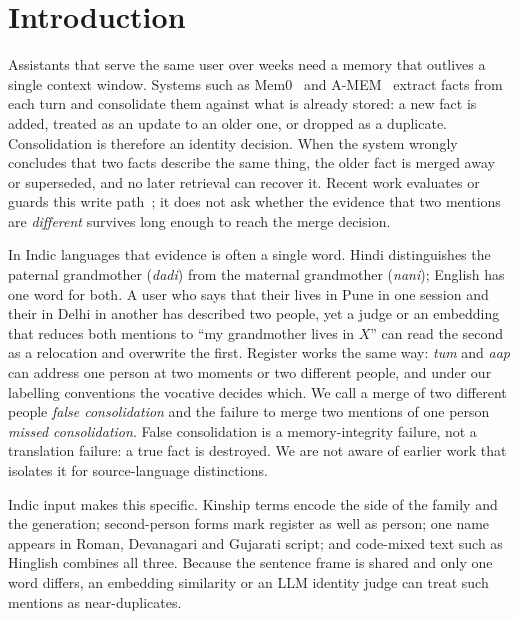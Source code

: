 \section{Introduction}
\label{sec:intro}

Assistants that serve the same user over weeks need a memory that outlives a single context window. Systems such as
Mem0~\citep{chhikara2025mem0} and A-MEM~\citep{xu2025amem} extract facts from each turn and consolidate them against what is already
stored: a new fact is added, treated as an update to an older one, or dropped as a duplicate. Consolidation is therefore an identity
decision. When the system wrongly concludes that two facts describe the same thing, the older fact is merged away or superseded, and no
later retrieval can recover it. Recent work evaluates or guards this write path~\citep{chen2025halumem,zhao2026mosaic}; it does not ask
whether the evidence that two mentions are \emph{different} survives long enough to reach the merge decision.

In Indic languages that evidence is often a single word. Hindi distinguishes the paternal grandmother  (\emph{dadi}) from the
maternal grandmother  (\emph{nani}); English has one word for both. A user who says that their  lives in Pune in one
session and their  in Delhi in another has described two people, yet a judge or an embedding that reduces both mentions to ``my
grandmother lives in $X$'' can read the second as a relocation and overwrite the first. Register works the same way: \emph{tum} and
\emph{aap} can address one person at two moments or two different people, and under our labelling conventions the vocative decides which.
We call a merge of two different people \emph{false consolidation} and the failure to merge two mentions of one person \emph{missed
consolidation}. False consolidation is a memory-integrity failure, not a translation failure: a true fact is destroyed. We are not aware of
earlier work that isolates it for source-language distinctions.

Indic input makes this specific. Kinship terms encode the side of the family and the generation; second-person forms mark register as well
as person; one name appears in Roman, Devanagari and Gujarati script; and code-mixed text such as Hinglish combines all three. Because the
sentence frame is shared and only one word differs, an embedding similarity or an LLM identity judge can treat such mentions as
near-duplicates.

